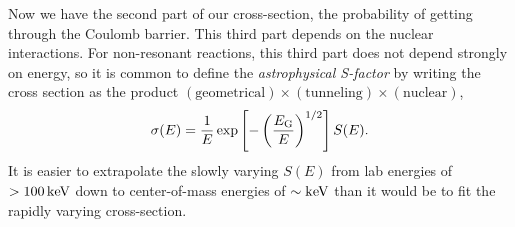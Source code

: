 Now we have the second part of our cross-section, the probability of getting through the Coulomb barrier.  This third part depends on the nuclear interactions.  For non-resonant reactions, this third part does not depend strongly on energy, so it is common to define the \emph{astrophysical S-factor} by writing the cross section as the product $(\textrm{geometrical})\times(\textrm{tunneling})\times(\textrm{nuclear})$, 
\begin{equation}\label{e.s-def}
\sigma(E) = \frac{1}{E}\exp\left[-\left(\frac{E_{\mathrm{G}}}{E}\right)^{1/2}\right] S(E).
\end{equation}
It is easier to extrapolate the slowly varying $S(E)$ from lab energies of $> 100\,\mathrm{k}\mathrm{eV}$ down to center-of-mass energies of $\sim \mathrm{k}\mathrm{eV}$ than it would be to fit the rapidly varying cross-section.

